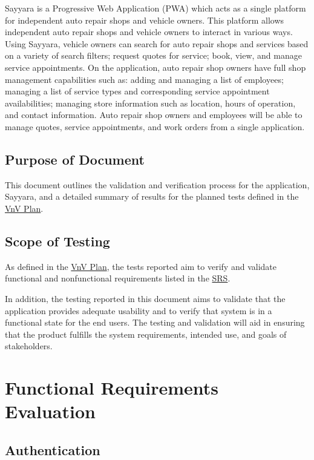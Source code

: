 \documentclass[12pt, titlepage]{article}
\begin{document}
Sayyara is a Progressive Web Application (PWA) which acts as a single platform for independent auto
repair shops and vehicle owners. This platform allows independent auto repair shops and vehicle
owners to interact in various ways. Using Sayyara, vehicle owners can search for auto repair shops
and services based on a variety of search filters; request quotes for service; book, view, and
manage service appointments. On the application, auto repair shop owners have full shop management
capabilities such as: adding and managing a list of employees; managing a list of service types and
corresponding service appointment availabilities; managing store information such as location,
hours of operation, and contact information. Auto repair shop owners and employees will be able to
manage quotes, service appointments, and work orders from a single application.

\subsection{Purpose of Document}
This document outlines the validation and verification process for the application, Sayyara, and a
detailed summary of results for the planned tests defined in the
\href{https://github.com/arkinmodi/project-sayyara/blob/main/docs/VnVPlan/VnVPlan.pdf}{VnV Plan}.

\subsection{Scope of Testing}
As defined in the
\href{https://github.com/arkinmodi/project-sayyara/blob/main/docs/VnVPlan/VnVPlan.pdf}{VnV Plan},
the tests reported aim to verify and validate functional and nonfunctional requirements listed in
the \href{https://github.com/arkinmodi/project-sayyara/blob/main/docs/SRS/SRS.pdf}{SRS}.

In addition, the testing reported in this document aims to validate that the application provides
adequate usability and to verify that system is in a functional state for the end users. The
testing and validation will aid in ensuring that the product fulfills the system requirements,
intended use, and goals of stakeholders.

\section{Functional Requirements Evaluation}

\subsection{Authentication}
\end{document}
